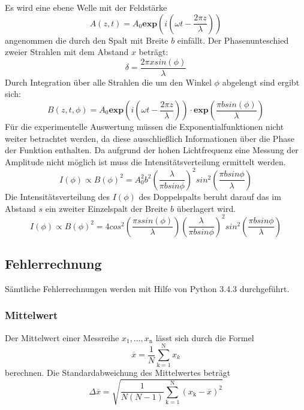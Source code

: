 Es wird eine ebene Welle mit der Feldstärke 
\begin{equation}
  A(z,t)= A_0 \textbf{exp} \left( i \left( \omega t - \frac{2 \pi z}{\lambda}   \right) \right)
  \label{eqn:welle}
\end{equation}
angenommen die durch den Spalt mit Breite $b$ einfällt. Der Phasenunteschied zweier Strahlen mit dem Abstand $x$ beträgt:
\begin{equation}
  \delta = \frac{2 \pi x sin(\phi)}{\lambda}
  \label{eqn:phase}
\end{equation}
Durch Integration über alle Strahlen die um den Winkel $\phi$ abgelengt sind ergibt sich:
\begin{equation}
  B(z,t,\phi) = A_0 \textbf{exp} \left( i \left( \omega t - \frac{2 \pi z}{\lambda} \right) \right) \cdot \textbf{exp} \left( \frac{\pi b sin(\phi)}{\lambda} \right)
  \label{}
\end{equation}
Für die experimentelle Auswertung müssen die Exponentialfunktionen nicht weiter betrachtet werden, da diese ausschließlich Informationen über die Phase der Funktion enthalten. Da aufgrund der hohen Lichtfrequenz eine Messung der Amplitude nicht möglich ist muss die Intensitätsverteilung  ermittelt werden.
\begin{equation}
  I(\phi) \propto B(\phi)^2 = A_0^2 b^2 \left( \frac{\lambda}{\pi b sin \phi} \right)^2 sin^2 \left( \frac{\pi b sin \phi}{\lambda} \right)
  \label{eqn:I}
\end{equation}
Die Intensitätsverteilung des $I(\phi)$ des Doppelspalts beruht darauf das im Abstand $s$ ein zweiter Einzelspalt der Breite $b$ überlagert wird.
\begin{equation}
  I(\phi) \propto B(\phi)^2 = 4cos^2\left( \frac{\pi s sin(\phi)}{\lambda} \right) \left( \frac{\lambda}{\pi b sin \phi} \right)^2 sin^2 \left( \frac{\pi b sin \phi}{\lambda} \right)
  \label{eqn:Id}
\end{equation}

\subsection{Fehlerrechnung}
Sämtliche Fehlerrechnungen werden mit Hilfe von Python 3.4.3 durchgeführt.
\subsubsection{Mittelwert}
Der Mittelwert einer Messreihe $x_\text{1}, ... ,x_\text{n}$ lässt sich durch die Formel
\begin{equation}
	\overline{x} = \frac{1}{N} \sum_{\text{k}=1}^\text{N} x_k
	\label{eqn:ave}
\end{equation}
berechnen. Die Standardabweichung des Mittelwertes beträgt
\begin{equation}
	\Delta \overline{x} = \sqrt{ \frac{1}{N(N-1)} \sum_{\text{k}=1}^\text{N} (x_\text{k} - \overline{x})^2}
	\label{eqn:std}
\end{equation}

